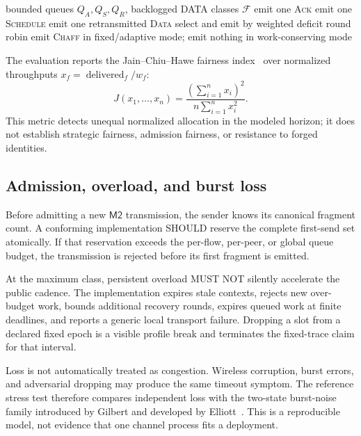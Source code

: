 \documentclass[11pt,oneside]{article}
\newcommand{\Mtwo}{\ensuremath{\mathsf{M2}}}
\newcommand{\Ttwo}{\ensuremath{\mathsf{T2}}}
\begin{document}
\begin{algorithm}[ht]
\caption{One \Ttwo{} physical slot}
\label{alg:t2service}
\begin{algorithmic}[1]
\Require bounded queues $Q_A,Q_S,Q_R$, backlogged DATA classes $\mathcal{F}$
  \State emit one \textsc{Ack}
  \State emit one \textsc{Schedule}
  \State emit one retransmitted \textsc{Data}
  \State select and emit by weighted deficit round robin
\Else
  \State emit \textsc{Chaff} in fixed/adaptive mode; emit nothing in work-conserving mode
\EndIf
\end{algorithmic}
\end{algorithm}

The evaluation reports the Jain--Chiu--Hawe fairness index~\cite{jainfairness} over normalized throughputs $x_f=\operatorname{delivered}_f/w_f$:
\begin{equation}
J(x_1,\ldots,x_n)=\frac{(\sum_{i=1}^{n}x_i)^2}{n\sum_{i=1}^{n}x_i^2}.
\label{eq:jain}
\end{equation}
This metric detects unequal normalized allocation in the modeled horizon; it does not establish strategic fairness, admission fairness, or resistance to forged identities.

\subsection{Admission, overload, and burst loss}

Before admitting a new \Mtwo{} transmission, the sender knows its canonical fragment count. A conforming implementation SHOULD reserve the complete first-send set atomically. If that reservation exceeds the per-flow, per-peer, or global queue budget, the transmission is rejected before its first fragment is emitted.

At the maximum class, persistent overload MUST NOT silently accelerate the public cadence. The implementation expires stale contexts, rejects new over-budget work, bounds additional recovery rounds, expires queued work at finite deadlines, and reports a generic local transport failure. Dropping a slot from a declared fixed epoch is a visible profile break and terminates the fixed-trace claim for that interval.

Loss is not automatically treated as congestion. Wireless corruption, burst errors, and adversarial dropping may produce the same timeout symptom. The reference stress test therefore compares independent loss with the two-state burst-noise family introduced by Gilbert and developed by Elliott~\cite{gilbert1960,elliott1963}. This is a reproducible model, not evidence that one channel process fits a deployment.
\end{document}
